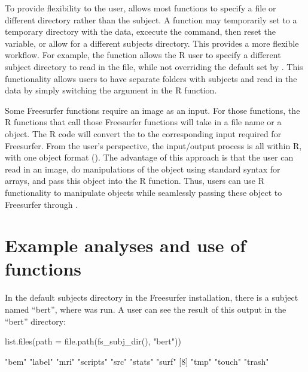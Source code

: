 To provide flexibility to the user,  allows most
functions to specify a file or different directory rather than the
subject. A function may temporarily set  to a
temporary directory with the data, excecute the command, then reset the
 variable, or allow for a different subjects
directory. This provides a more flexible workflow. For example, the
  function allows the R user to
specify a different subject directory to read in the file, while not
overriding the default set by . This functionality
allows users to have separate folders with subjects and read in the data
by simply switching the  argument in the R function.

Some Freesurfer functions require an image as an input. For those
functions, the R  functions that call those Freesurfer
functions will take in a file name or a  object. The R code
will convert the  to the corresponding input required for
Freesurfer. From the user's perspective, the input/output process is all
within R, with one object format (). The advantage of this
approach is that the user can read in an image, do manipulations of the
 object using standard syntax for arrays, and pass this
object into the  R function. Thus, users can use R
functionality to manipulate objects while seamlessly passing these
object to Freesurfer through .

\section{Example analyses and use of
functions}\label{example-analyses-and-use-of-functions}

In the default subjects directory in the Freesurfer installation, there
is a subject named ``bert'', where  was run. A user can
see the result of this output in the ``bert'' directory:

\begin{Schunk}
\begin{Sinput}
list.files(path  = file.path(fs_subj_dir(), "bert"))
\end{Sinput}
\begin{Soutput}
 [1] "bem"     "label"   "mri"     "scripts" "src"     "stats"   "surf"   
 [8] "tmp"     "touch"   "trash"  
\end{Soutput}
\end{Schunk}

